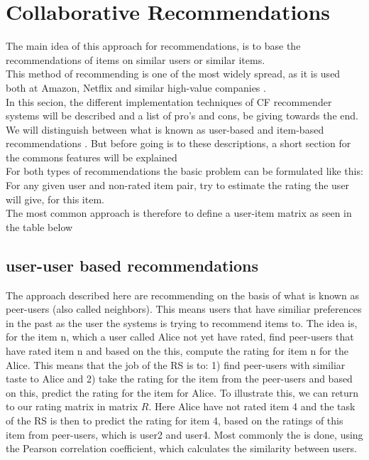 \section{Collaborative Recommendations}
\label{sub:basic_collaborative_recommendations}
The main idea of this approach for recommendations, is to base the recommendations of items on similar users or similar items.\\
This method of recommending is one of the most widely spread, as it is used both at Amazon, Netflix and similar high-value companies .\\
In this secion, the different implementation techniques of CF recommender systems will be described and a list of pro's and cons, be giving towards the end. We will distinguish between what is known as user-based and item-based recommendations . But before going is to these descriptions, a short section for the commons features will be explained\\

For both types of recommendations the basic problem can be formulated like this: For any given user and non-rated item pair, try to estimate the rating the user will give, for this item.\\
The most common approach is therefore to define a user-item matrix as seen in the table below 


\subsection{user-user based recommendations} %
\label{sub:user_user_based_recommendations}
The approach described here are recommending on the basis of what is known as peer-users (also called neighbors). This means users that have similiar preferences in the past as the user the systems is trying to recommend items to. The idea is, for the item n, which a user called Alice not yet have rated, find peer-users that have rated item n and based on the this, compute the rating for item n for the Alice. This means that the job of the RS is to: 1) find peer-users with similiar taste to Alice and 2) take the rating for the item from the peer-users and based on this, predict the rating for the item for Alice.
To illustrate this, we can return to our rating matrix in matrix \(R\). Here Alice have not rated item 4 and the task of the RS is then to predict the rating for item 4, based on the ratings of this item from peer-users, which is user2 and user4. Most commonly the is done, using the Pearson correlation coefficient, which calculates the similarity between users.

